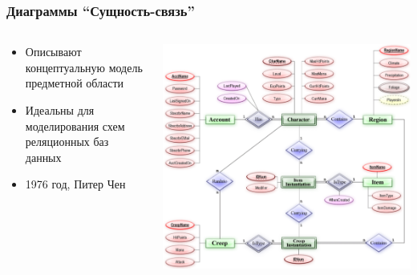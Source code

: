 \documentclass{../../slides-style}
\begin{document}
    \begin{frame}
        \frametitle{Диаграммы ``Сущность-связь''}
        \begin{columns}
            \begin{column}{0.5\textwidth}
                \begin{itemize}
                    \item Описывают концептуальную модель предметной области
                    \item Идеальны для моделирования схем реляционных баз данных
                    \item 1976 год, Питер Чен
                \end{itemize}
            \end{column}
            \begin{column}{0.5\textwidth}
                \begin{center}
                    \includegraphics[width=\textwidth]{erChenNotation.png}
                \end{center}
            \end{column}
        \end{columns}
    \end{frame}
\end{document}
